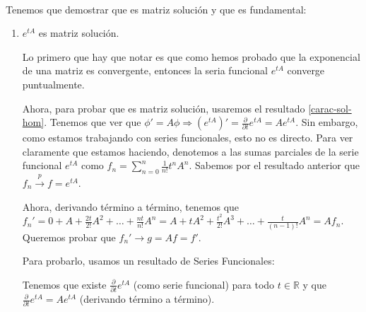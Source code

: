 \documentclass[11pt]{article}
\makeatletter
\theoremstyle{theorem-style}  %
\renewenvironment{proof}[1][\proofname]{\par
	\pushQED{\qed}%
	\normalfont \topsep6\p@\@plus6\p@\relax
	\list{}{%
		\settowidth{\leftmargin}{\quad:\hskip\labelsep}%
		\setlength{\labelwidth}{0pt}%
		\setlength{\itemindent}{-\leftmargin}%
	}%
	\item[\hskip\labelsep\itshape#1\@addpunct{:}]\ignorespaces
}{%
	\popQED\endlist\@endpefalse
}
\theoremstyle{definition-style}
\theoremstyle{example-style}
\makeatother
\begin{document}
\begin{proof} \ \\
	Tenemos que demostrar que es matriz solución y que es fundamental:
	\begin{enumerate}[\quad i)]
		\item $ e^{tA} $ es matriz solución.
		
		 Lo primero que hay que notar es que como hemos probado que la exponencial de una matriz es convergente, entonces la seria funcional $ e^{tA} $ converge puntualmente.
		
		Ahora, para probar que es matriz solución, usaremos el resultado \ref{carac-sol-hom}. Tenemos que ver que $ \phi'=A\phi \Rightarrow  (e^{tA})'=\frac{\partial}{\partial t}e^{tA}=Ae^{tA}$. Sin embargo, como estamos trabajando con series funcionales, esto no es directo. Para ver claramente que estamos haciendo, denotemos a las sumas parciales de la serie funcional $ e^{tA} $ como $ f_n =\sum_{n=0}^{n} \frac{1}{n!}t^nA^n$. Sabemos por el resultado anterior que $ f_n \xrightarrow{p} f=e^{tA}$.
		
		Ahora, derivando término a término, tenemos que $ f_n'=0+A+ \frac{2t}{2!}A^2+\dots+\frac{nt}{n!}A^n =A+tA^2+\frac{t^2}{2!}A^3+\dots+\frac{t}{(n-1)!}A^n=Af_n $. Queremos probar que $ f_n'\rightarrow g=Af=f' $.
		
		Para probarlo, usamos un resultado de Series Funcionales:
		
		
		\noindent{}
		
		Tenemos que existe $ \frac{\partial}{\partial t}e^{tA}$ (como serie funcional) para todo $t \in \mathbb{R} $ y que $ \frac{\partial}{\partial t}e^{tA}=Ae^{tA} $ (derivando término a término). 
		

\end{enumerate}
\end{proof}
\end{document}
